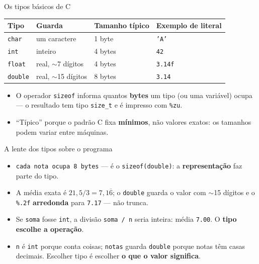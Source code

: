 \documentclass[aspectratio=169]{beamer}
\begin{document}
\begin{frame}[fragile]{Os tipos básicos de C}
  \begin{center}
  \begin{tabular}{llll}
    \toprule
    Tipo & Guarda & Tamanho típico & Exemplo de literal \\
    \midrule
    \texttt{char}   & um caractere        & 1 byte  & \texttt{'A'} \\
    \texttt{int}    & inteiro             & 4 bytes & \texttt{42} \\
    \texttt{float}  & real, $\sim$7 dígitos  & 4 bytes & \texttt{3.14f} \\
    \texttt{double} & real, $\sim$15 dígitos & 8 bytes & \texttt{3.14} \\
    \bottomrule
  \end{tabular}
  \end{center}
  \vspace{0.5em}
  \begin{itemize}
    \item O operador \texttt{sizeof} informa quantos \textbf{bytes} um tipo
      (ou uma variável) ocupa --- o resultado tem tipo \texttt{size\_t} e é
      impresso com \texttt{\%zu}.
    \item ``Típico'' porque o padrão C fixa \textbf{mínimos}, não valores
      exatos: os tamanhos podem variar entre máquinas.
  \end{itemize}
\end{frame}

\begin{frame}{A lente dos tipos sobre o programa}
  \begin{itemize}
    \item \texttt{cada nota ocupa 8 bytes} --- é o \texttt{sizeof(double)}:
      a \textbf{representação} faz parte do tipo.
    \item A média exata é $21{,}5 / 3 = 7{,}1\overline{6}$; o
      \texttt{double} guarda o valor com $\sim$15 dígitos e o \texttt{\%.2f}
      \textbf{arredonda} para \texttt{7.17} --- não trunca.
    \item Se \texttt{soma} fosse \texttt{int}, a divisão \texttt{soma / n}
      seria inteira: média \texttt{7.00}. O \textbf{tipo escolhe a operação}.
    \item \texttt{n} é \texttt{int} porque conta coisas; \texttt{notas}
      guarda \texttt{double} porque notas têm casas decimais. Escolher tipo é
      escolher \textbf{o que o valor significa}.
  \end{itemize}
\end{frame}
\end{document}
